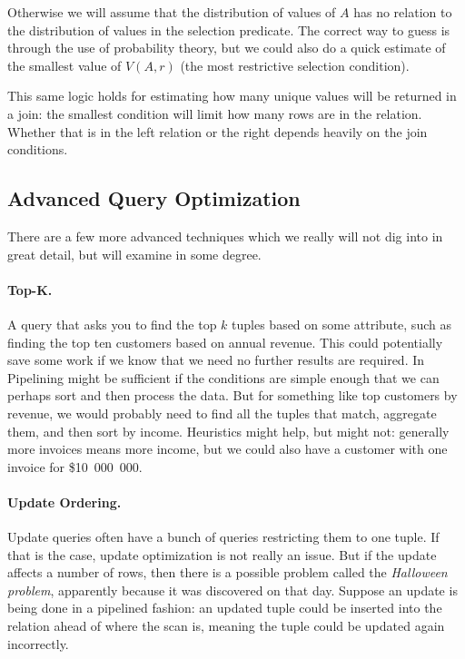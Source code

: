 Otherwise we will assume that the distribution of values of $A$ has no relation to the distribution of values in the selection predicate. The correct way to guess is through the use of probability theory, but we could also do a quick estimate of the smallest value of $V(A, r)$ (the most restrictive selection condition). 

This same logic holds for estimating how many unique values will be returned in a join: the smallest condition will limit how many rows are in the relation. Whether that is in the left relation or the right depends heavily on the join conditions. 

\subsection*{Advanced Query Optimization}

There are a few more advanced techniques which we really will not dig into in great detail, but will examine in some degree. 

\paragraph{Top-K.} A query that asks you to find the top $k$ tuples based on some attribute, such as finding the top ten customers based on annual revenue. This could potentially save some work if we know that we need no further results are required. In Pipelining might be sufficient if the conditions are simple enough that we can perhaps sort and then process the data. But for something like top customers by revenue, we would probably need to find all the tuples that match, aggregate them, and then sort by income. Heuristics might help, but might not: generally more invoices means more income, but we could also have a customer with one invoice for \$10~000~000. 

\paragraph{Update Ordering.} 

Update queries often have a bunch of queries restricting them to one tuple. If that is the case, update optimization is not really an issue. But if the update affects a number of rows, then there is a possible problem called the \textit{Halloween problem}, apparently because it was discovered on that day. Suppose an update is being done in a pipelined fashion: an updated tuple could be inserted into the relation ahead of where the scan is, meaning the tuple could be updated again incorrectly. 

